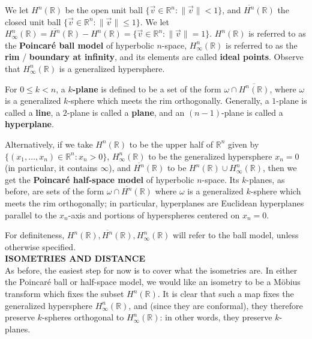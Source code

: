 \documentclass[leqno]{book}
\begin{document}
We let $H^n(\mathbb R)$ be the open unit ball $\{\vec v\in\mathbb R^n:\|\vec v\|<1\}$, and $\overline{H^n}(\mathbb R)$ the closed unit ball $\{\vec v\in\mathbb R^n:\|\vec v\|\leqslant 1\}$.  We let $H^n_\infty(\mathbb R)=\overline{H^n}(\mathbb R)-H^n(\mathbb R)=\{\vec v\in\mathbb R^n:\|\vec v\|=1\}$.  $H^n(\mathbb R)$ is referred to as the \textbf{Poincar\'e ball model} of hyperbolic $n$-space, $H^n_\infty(\mathbb R)$ is referred to as the \textbf{rim} / \textbf{boundary at infinity}, and its elements are called \textbf{ideal points}.  Observe that $H^n_\infty(\mathbb R)$ is a generalized hypersphere.

For $0\leqslant k<n$, a \textbf{$k$-plane} is defined to be a set of the form $\omega\cap\overline{H^n(\mathbb R)}$, where $\omega$ is a generalized $k$-sphere which meets the rim orthogonally.  Generally, a $1$-plane is called a \textbf{line}, a $2$-plane is called a \textbf{plane}, and an $(n-1)$-plane is called a \textbf{hyperplane}.

Alternatively, if we take $H^n(\mathbb R)$ to be the upper half of $\mathbb R^n$ given by $\{(x_1,\dots,x_n)\in\mathbb R^n:x_n>0\}$, $H^n_\infty(\mathbb R)$ to be the generalized hypersphere $x_n=0$ (in particular, it contains $\infty$), and $\overline{H^n}(\mathbb R)$ to be $H^n(\mathbb R)\cup H^n_\infty(\mathbb R)$, then we get the \textbf{Poincar\'e half-space model} of hyperbolic $n$-space.  Its $k$-planes, as before, are sets of the form $\omega\cap\overline{H^n}(\mathbb R)$ where $\omega$ is a generalized $k$-sphere which meets the rim orthogonally; in particular, hyperplanes are Euclidean hyperplanes parallel to the $x_n$-axis and portions of hyperspheres centered on $x_n=0$.

For definiteness, $H^n(\mathbb R),\overline{H^n}(\mathbb R),H^n_\infty(\mathbb R)$ will refer to the ball model, unless otherwise specified.\\

\noindent\textbf{ISOMETRIES AND DISTANCE}\\

\noindent As before, the easiest step for now is to cover what the isometries are.  In either the Poincar\'e ball or half-space model, we would like an isometry to be a M\"obius transform which fixes the subset $H^n(\mathbb R)$.  It is clear that such a map fixes the generalized hypersphere $H^n_\infty(\mathbb R)$, and (since they are conformal), they therefore preserve $k$-spheres orthogonal to $H^n_\infty(\mathbb R)$: in other words, they preserve $k$-planes.
\end{document}
